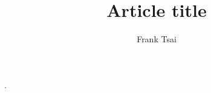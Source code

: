 \documentclass[a4paper]{article}
\title{Article title}
\author{Frank Tsai}
\begin{document}
\maketitle

\cite{Awodey17}.



\end{document}
